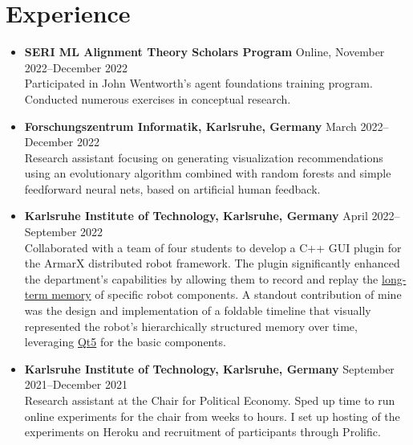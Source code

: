 \documentclass[letterpaper,9pt]{article}
\begin{document}
\section{Experience}
\begin{itemize}
  \item \textbf{SERI ML Alignment Theory Scholars Program} \hfill Online, November 2022--December 2022 \\
  Participated in John Wentworth's agent foundations training program. Conducted numerous exercises in conceptual research.
  \item \textbf{Forschungszentrum Informatik, Karlsruhe, Germany} \hfill March 2022--December 2022 \\
  Research assistant focusing on generating visualization recommendations using an
  evolutionary algorithm combined with random forests and simple feedforward neural nets,
  based on artificial human feedback.
  \item \textbf{Karlsruhe Institute of Technology, Karlsruhe, Germany} \hfill April 2022--September 2022 \\
  Collaborated with a team of four students to develop a C++ GUI plugin for the
  ArmarX distributed robot framework. The plugin
  significantly enhanced the department's capabilities by allowing them to record and replay the
  \href{https://armarx.humanoids.kit.edu/MemoryX-LongtermMemory.html}{long-term
  memory} of specific robot components. A standout contribution of mine was the
  design and implementation of a foldable timeline that visually represented the
  robot's hierarchically structured memory over time,
  leveraging \href{https://doc.qt.io/qt-5/}{Qt5} for the basic components.
  \item \textbf{Karlsruhe Institute of Technology, Karlsruhe, Germany} \hfill September 2021--December 2021 \\
  Research assistant at the Chair for Political Economy. Sped up time to run online experiments for the chair from weeks to hours. I set up hosting of the experiments on Heroku and recruitment of participants through Prolific. %
\end{itemize}

\ifdefined\EAVersion
\end{document}
